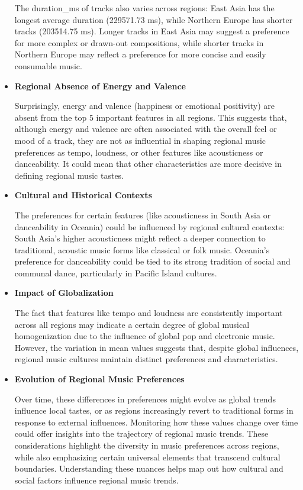 \begin{itemize}
The duration\_ms of tracks also varies across regions:
East Asia has the longest average duration (229571.73 ms), while Northern Europe has shorter tracks (203514.75 ms).
Longer tracks in East Asia may suggest a preference for more complex or drawn-out compositions, while shorter tracks in Northern Europe may reflect a preference for more concise and easily consumable music.
\item\textbf{Regional Absence of Energy and Valence}

Surprisingly, energy and valence (happiness or emotional positivity) are absent from the top 5 important features in all regions.
This suggests that, although energy and valence are often associated with the overall feel or mood of a track, they are not as influential in shaping regional music preferences as tempo, loudness, or other features like acousticness or danceability. It could mean that other characteristics are more decisive in defining regional music tastes.
\item\textbf{Cultural and Historical Contexts}

The preferences for certain features (like acousticness in South Asia or danceability in Oceania) could be influenced by regional cultural contexts:
South Asia's higher acousticness might reflect a deeper connection to traditional, acoustic music forms like classical or folk music.
Oceania’s preference for danceability could be tied to its strong tradition of social and communal dance, particularly in Pacific Island cultures.
\item\textbf{Impact of Globalization}

The fact that features like tempo and loudness are consistently important across all regions may indicate a certain degree of global musical homogenization due to the influence of global pop and electronic music.
However, the variation in mean values suggests that, despite global influences, regional music cultures maintain distinct preferences and characteristics.
\item\textbf{Evolution of Regional Music Preferences}

Over time, these differences in preferences might evolve as global trends influence local tastes, or as regions increasingly revert to traditional forms in response to external influences.
Monitoring how these values change over time could offer insights into the trajectory of regional music trends.
These considerations highlight the diversity in music preferences across regions, while also emphasizing certain universal elements that transcend cultural boundaries. Understanding these nuances helps map out how cultural and social factors influence regional music trends.
\end{itemize}
